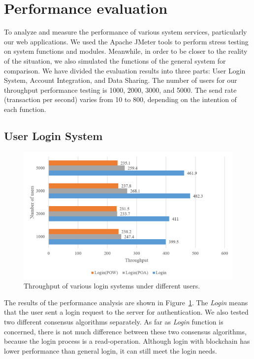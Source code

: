\section{Performance evaluation}
To analyze and measure the performance of various system services, particularly our web applications. We used the Apache JMeter tools to perform stress testing on system functions and modules. Meanwhile, in order to be closer to the reality of the situation, we also simulated the functions of the general system for comparison. We have divided the evaluation results into three parts: User Login System, Account Integration, and Data Sharing. The number of users for our throughput performance testing is 1000, 2000, 3000, and 5000. The send rate (transaction per second) varies from 10 to 800, depending on the intention of each function.
\subsection*{User Login System}
\begin{figure}[htb]
    \centering
    \includegraphics[height=!,width=0.9\linewidth,keepaspectratio=true]{figures/login-throughput.png}
    \caption{{\footnotesize Throughput of various login systems under different users.}}
    \label{fig:loginThroughput}
\end{figure}
The results of the performance analysis are shown in Figure~\ref{fig:loginThroughput}. The \textit{Login} means that the user sent a login request to the server for authentication. We also tested two different consensus algorithms separately. As far as \textit{Login} function is concerned, there is not much difference between these two consensus algorithms, because the login process is a read-operation. Although login with blockchain has lower performance than general login, it can still meet the login needs.
\newpage

